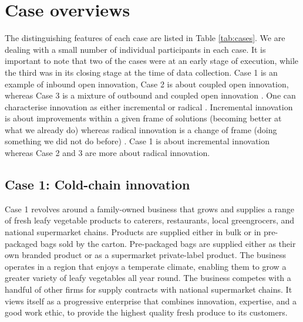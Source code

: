 \section{Case overviews}

The distinguishing features of each case are listed in Table \ref{tab:cases}. We are dealing with a small number of individual participants in each case. It is important to note that two of the cases were at an early stage of execution, while the third was in its closing stage at the time of data collection. Case 1 is an example of inbound open innovation, Case 2 is about coupled open innovation, whereas Case 3 is a mixture of outbound and coupled open innovation \citep{gassmann2004towards}. One can characterise innovation as either incremental or radical \citep{ettlie1984organization}. Incremental innovation is about improvements within a given frame of solutions (becoming better at what we already do) whereas radical innovation is a change of frame (doing something we did not do before) \citep{norman2014incremental}. Case 1 is about incremental innovation whereas Case 2 and 3 are more about radical innovation.


\subsection{Case 1: Cold-chain innovation}

Case 1 revolves around a family-owned business that grows and supplies a range of fresh leafy vegetable products to caterers, restaurants, local greengrocers, and national supermarket chains. Products are supplied either in bulk or in pre-packaged bags sold by the carton. Pre-packaged bags are supplied either as their own branded product or as a supermarket private-label product. The business operates in a region that enjoys a temperate climate, enabling them to grow a greater variety of leafy vegetables all year round. The business competes with a handful of other firms for supply contracts with national supermarket chains. It views itself as a progressive enterprise that combines innovation, expertise, and a good work ethic, to provide the highest quality fresh produce to its customers. \medskip

